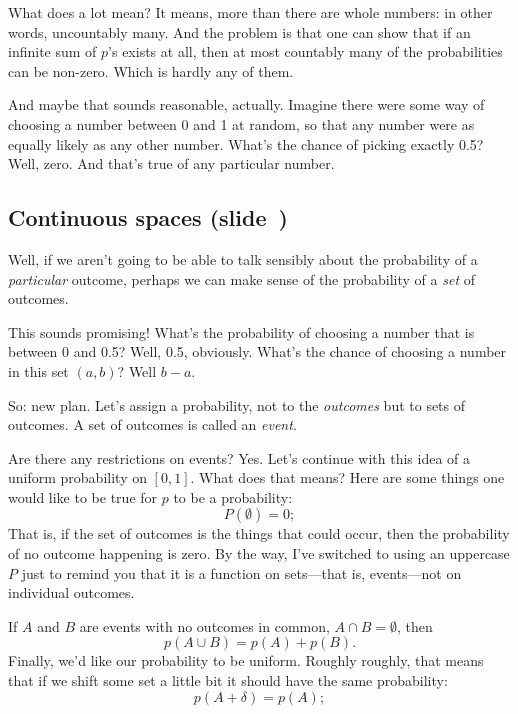 \documentclass[11pt]{article}
\begin{document}
What does a lot mean? It means, more than there are whole numbers: in other
words, uncountably many. And the problem is that one can show that if an
infinite sum of $p$'s exists at all, then at most countably many of the
probabilities can be non-zero. Which is hardly any of them.

And maybe that sounds reasonable, actually. Imagine there were some way of
choosing a number between 0 and 1 at random, so that any number were as equally
likely as any other number. What's the chance of picking exactly 0.5? Well,
zero. And that's true of any particular number.

\newpage
\subsection*{Continuous spaces (slide~\pageref{slide:continuous})}

Well, if we aren't going to be able to talk sensibly about the probability of a
\emph{particular} outcome, perhaps we can make sense of the probability of a
\emph{set} of outcomes.

This sounds promising! What's the probability of choosing a number that is
between 0 and 0.5? Well, 0.5, obviously. What's the chance of choosing a number
in this set $(a, b)$? Well $b - a$.

So: new plan. Let's assign a probability, not to the \emph{outcomes} but to sets of
outcomes. A set of outcomes is called an \emph{event}.

Are there any restrictions on events? Yes. Let's continue with this idea of a
uniform probability on $[0,1]$. What does that means? Here are some things one
would like to be true for $p$ to be a probability:
\begin{equation}
P(\emptyset) = 0;
\end{equation}
That is, if the set of outcomes is the things that could occur, then the
probability of no outcome happening is zero. By the way, I've switched to using
an uppercase $P$ just to remind you that it is a function on sets---that is,
events---not on individual outcomes. 

If $A$ and $B$ are events with no outcomes in common, \(A\cap B = \emptyset\), then
\begin{equation}
p(A \cup B) = p(A) + p(B).
\end{equation}
Finally, we'd like our probability to be uniform. Roughly roughly, that means
that if we shift some set a little bit it should have the same probability:
\begin{equation}
p(A + \delta) = p(A);
\end{equation}
\end{document}
